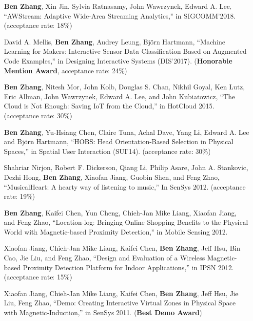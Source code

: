 
\begin{cventries}

{
  \fontsize{10pt}{1.2em}
  \bodyfontlight\color{text}

  \begin{cvitems}

    \vspace{1em}

  \item {\bf Ben Zhang}, Xin Jin, Sylvia Ratnasamy, John Wawrzynek, Edward
    A. Lee, ``AWStream: Adaptive Wide-Area Streaming Analytics,'' in
    SIGCOMM'2018. (acceptance rate: 18\%)

  \item David A. Mellis, {\bf Ben Zhang}, Audrey Leung, Bj\"orn Hartmann,
    ``Machine Learning for Makers: Interactive Sensor Data Classification Based
    on Augmented Code Examples,'' in Designing Interactive Systems
    (DIS'2017). (\textbf{Honorable Mention Award}, acceptance rate: 24\%)

  \item {\bf Ben Zhang}, Nitesh Mor, John Kolb, Douglas S. Chan, Nikhil Goyal,
    Ken Lutz, Eric Allman, John Wawrzynek, Edward A. Lee, and John Kubiatowicz,
    ``The Cloud is Not Enough: Saving IoT from the Cloud,'' in HotCloud
    2015. (acceptance rate: 30\%)

  \item {\bf Ben Zhang}, Yu-Hsiang Chen, Claire Tuna, Achal Dave, Yang Li,
    Edward A. Lee and Bj\"orn Hartmann, ``HOBS: Head Orientation-Based Selection
    in Physical Spaces,'' in Spatial User Interaction (SUI'14). (acceptance
    rate: 30\%)

  \item Shahriar Nirjon, Robert F. Dickerson, Qiang Li, Philip Asare, John
    A. Stankovic, Dezhi Hong, {\bf Ben Zhang}, Xiaofan Jiang, Guobin Shen, and
    Feng Zhao, ``MusicalHeart: A hearty way of listening to music,'' In SenSys
    2012. (acceptance rate: 19\%)

  \item {\bf Ben Zhang}, Kaifei Chen, Yun Cheng, Chieh-Jan Mike Liang, Xiaofan
    Jiang, and Feng Zhao, ``Location-log: Bringing Online Shopping Benefits to
    the Physical World with Magnetic-based Proximity Detection,'' in Mobile
    Sensing 2012.

  \item Xiaofan Jiang, Chieh-Jan Mike Liang, Kaifei Chen, {\bf Ben Zhang}, Jeff
    Hsu, Bin Cao, Jie Liu, and Feng Zhao, ``Design and Evaluation of a Wireless
    Magnetic-based Proximity Detection Platform for Indoor Applications,'' in
    IPSN 2012. (acceptance rate: 15\%)

  \item Xiaofan Jiang, Chieh-Jan Mike Liang, Kaifei Chen, {\bf Ben Zhang}, Jeff
    Hsu, Jie Liu, Feng Zhao, ``Demo: Creating Interactive Virtual Zones in
    Physical Space with Magnetic-Induction,'' in SenSys 2011. ({\bf Best Demo
      Award})

  \end{cvitems}
}

\end{cventries}

